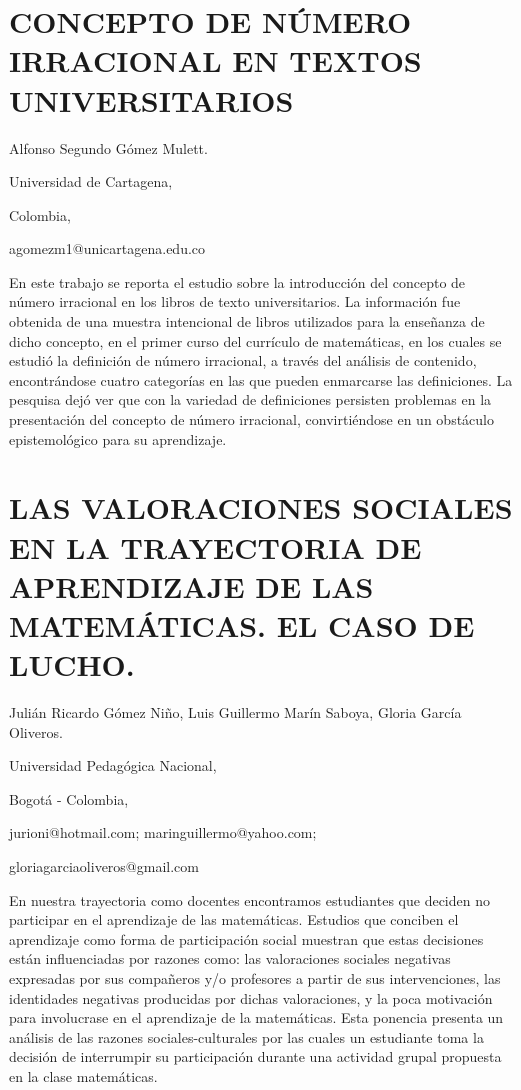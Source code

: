 \section{CONCEPTO DE NÚMERO IRRACIONAL EN TEXTOS UNIVERSITARIOS}

\begin{datos}

Alfonso Segundo Gómez Mulett.

Universidad de Cartagena, 

Colombia,

agomezm1@unicartagena.edu.co

\end{datos}

En este trabajo se reporta el estudio sobre la introducción del concepto
de número irracional en los libros de texto universitarios. La información
fue obtenida de una muestra intencional de libros utilizados para
la enseñanza de dicho concepto, en el primer curso del currículo de
matemáticas, en los cuales se estudió la definición de número irracional,
a través del análisis de contenido, encontrándose cuatro categorías
en las que pueden enmarcarse las definiciones. La pesquisa dejó ver
que con la variedad de definiciones persisten problemas en la presentación
del concepto de número irracional, convirtiéndose en un obstáculo
epistemológico para su aprendizaje. 


\section{LAS VALORACIONES SOCIALES EN LA TRAYECTORIA DE APRENDIZAJE DE LAS
MATEMÁTICAS. EL CASO DE LUCHO. }

\begin{datos}

Julián Ricardo Gómez Niño, Luis Guillermo Marín Saboya, Gloria García
Oliveros.

Universidad Pedagógica Nacional,

Bogotá - Colombia,

jurioni@hotmail.com; maringuillermo@yahoo.com;

gloriagarciaoliveros@gmail.com

\end{datos}

En nuestra trayectoria como docentes encontramos estudiantes que deciden
no participar en el aprendizaje de las matemáticas. Estudios que conciben
el aprendizaje como forma de participación social muestran que estas
decisiones están influenciadas por razones como: las valoraciones
sociales negativas expresadas por sus compañeros y/o profesores a
partir de sus intervenciones, las identidades negativas producidas
por dichas valoraciones, y la poca motivación para involucrase en
el aprendizaje de la matemáticas. Esta ponencia presenta un análisis
de las razones sociales-culturales por las cuales un estudiante toma
la decisión de interrumpir su participación durante una actividad
grupal propuesta en la clase matemáticas.


